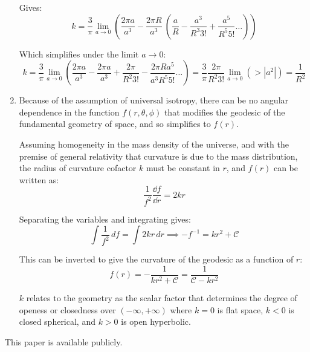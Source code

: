 \documentclass{paper}
\begin{document}
\begin{enumerate}
     Gives:
      \[ k = \frac{3}{\pi} \lim_{a \to 0} \left( \frac{2 \pi a}{a^3} - 
        \frac{2 \pi R}{a^3}\ \left( \frac{a}{R} - \frac{a^3}{R^3 3!} +
        \frac{a^5}{R^5 5!} \ldots \right) \right)\]

     Which simplifies under the limit \(a \to 0\):
      \[ k = \frac{3}{\pi} \lim_{a \to 0} \left( \frac{2 \pi a}{a^3} - 
        \frac{2 \pi a}{a^3} + \frac{2 \pi }{R^2 3!} - 
        \frac{2 \pi R a^5}{a^3 R^5 5!} \ldots \right) 
        = \frac{3}{\pi} \frac{2 \pi}{R^2 3!} \lim_{a \to 0}
        \left( > |a^2| \right) = \frac{1}{R^2} \]

   \item %
     Because of the assumption of universal isotropy, there can be no angular
     dependence in the function \(f{(r,\theta,\phi)}\) that modifies the 
     geodesic of the fundamental geometry of space, and so simplifies to 
     \(f{(r)}\).

     Assuming homogeneity in the mass density of the universe, and with the 
     premise of general relativity that curvature is due to the mass 
     distribution, the radius of curvature cofactor \(k\) must be constant 
     in \(r\), and \(f{(r)}\) can be written as:
     \[ \frac{1}{f^2} \frac{\dd{f}}{\dd{r}} = 2 k r \]

     Separating the variables and integrating gives:
     \[ \int \frac{1}{f^2} \,df = \int 2 k r \, dr  \implies 
       - f^{-1} = k r^2 + \mathcal{C} \]

     This can be inverted to give the curvature of the geodesic as a function
     of \(r\):
     \begin{equation}
       f{(r)} = - \frac{1}{k r^2 + \mathcal{C}} 
       = \frac{1}{\mathcal{C} - k r^2}
       \label{eqn:f_r}
     \end{equation}

     \(k\) relates to the geometry as the scalar factor that determines the
     degree of openess or closedness over \(\left( -\infty ,+\infty \right)\)
     where \( k = 0 \) is flat space, \( k < 0 \) is closed spherical, and
     \( k > 0 \) is open hyperbolic.

\end{enumerate}

This paper is available publicly.\cite{Hayden_Cosmology_Source_Repo}

\pagebreak
\printbibliography
\end{document}
